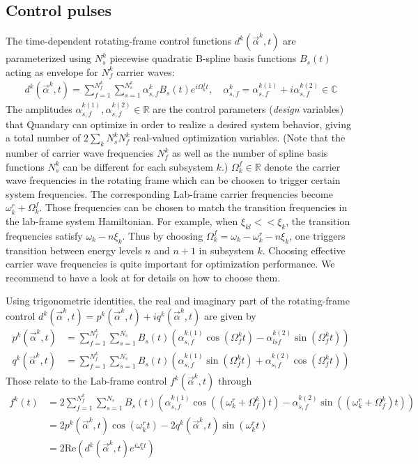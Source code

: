 \documentclass[11pt]{article}
\newcommand{\R}{\mathds{R}}
\newcommand{\C}{\mathds{C}}
\begin{document}
\subsection{Control pulses} \label{subsec:controlpulses}
The time-dependent rotating-frame control functions $d^k(\vec{\alpha}^k,t)$ are parameterized using $N_s^k$ piecewise quadratic B-spline basis functions $B_s(t)$ acting as envelope for $N_f^k$ carrier waves:
\begin{align}
  d^k(\vec{\alpha}^k,t) = \sum_{f=1}^{N_f^k} \sum_{s=1}^{N_s^k} \alpha_{s,f}^k B_s(t) e^{i\Omega_k^ft}, \quad \alpha_{s,f}^k = \alpha_{s,f}^{k(1)} + i \alpha_{s,f}^{k(2)} \in \C
\end{align}
The amplitudes $\alpha_{s,f}^{k(1)}, \alpha_{s,f}^{k(2)} \in \R$ are the control
parameters (\textit{design} variables) that Quandary can optimize in order to realize a
desired system behavior, giving a total number of $2\sum_kN_s^kN_f^k$ real-valued optimization variables. (Note that the number of carrier wave frequencies $N_f^k$ as well as the number of spline basis functions $N_s^k$ can be different for each subsystem $k$.) $\Omega_k^f \in \R$ denote the carrier wave frequencies in the rotating frame which can be choosen to trigger certain system frequencies. The corresponding Lab-frame carrier frequencies become $\omega_k^r + \Omega_k^f$. Those frequencies can be chosen to match the transition frequencies in the lab-frame system Hamiltonian. For example, when $\xi_{kl} << \xi_k$, the transition frequencies satisfy $\omega_k - n\xi_k$. Thus by choosing $\Omega_k^f = \omega_k-\omega_k^r - n \xi_k$, one triggers transition between energy levels $n$ and $n+1$ in subsystem $k$. Choosing effective carrier wave frequencies is quite important for optimization performance. We recommend to have a look at \cite{petersson2021optimal} for details on how to choose them.

Using trigonometric identities, the real and imaginary part of the rotating-frame control $d^k(\vec{\alpha}^k,t) = p^k(\vec{\alpha}^k,t) + iq^k(\vec{\alpha}^k,t)$ are given by
\begin{align}
  p^k(\vec{\alpha}^k,t) &= \sum_{f=1}^{N_f^k} \sum_{s=1}^{N_s} B_s(t)
  \left(\alpha^{k
  (1)}_{s,f} \cos(\Omega_f^k t) - \alpha^{k (2)}_{lsf} \sin(\Omega_f^k t)
  \right) \\
  q^k(\vec{\alpha}^k,t) &= \sum_{f=1}^{N_f^k} \sum_{s=1}^{N_s} B_s(t)\left( \alpha^{k
  (1)}_{s,f} \sin(\Omega_f^k t) + \alpha^{k (2)}_{s,f} \cos(\Omega_f^k t)
  \right)
\end{align}
Those relate to the Lab-frame control $f^k(\vec{\alpha}^k,t)$ through
\begin{align}
  f^k(t) &=  2\sum_{f=1}^{N_f^k} \sum_{s=1}^{N_s} B_s(t) \left(\alpha_{s,f}^{k(1)} \cos((\omega_k^{r} + \Omega_f^k) t) - \alpha_{s,f}^{k(2)}\sin((\omega_k^{r} + \Omega_f^k) t) \right) \\
         &= 2 p^k(\vec{\alpha}^k, t) \cos(\omega_k^{r} t) - 2 q^k(\vec{\alpha}^k,
         t)\sin(\omega_k^{r} t) \\
         &= 2\mbox{Re}\left( d^k(\vec{\alpha}^k,t)e^{i\omega_k^r t} \right)
\end{align}
\end{document}
